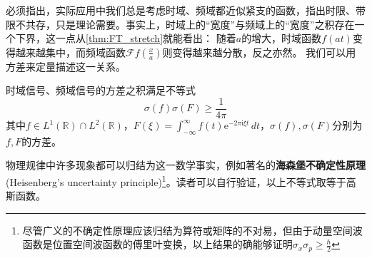 必须指出，实际应用中我们总是考虑时域、频域都近似紧支的函数，指出时限、带限不共存，只是理论需要。事实上，时域上的“宽度”与频域上的“宽度”之积存在一个下界，这一点从\cref{thm:FT_stretch}就能看出：
随着$a$的增大，时域函数$f(at)$变得越来越集中，而频域函数$\mathcal{F} f\left(\frac{x}{a}\right)$则变得越来越分散，反之亦然。
我们可以用方差来定量描述这一关系。
\begin{theorem}
    时域信号、频域信号的方差之积满足不等式
    \[\sigma(f)\sigma(F)\geq \frac{1}{4\pi}\]
    其中$f\in L^1(\mathbb{R} )\cap L^2(\mathbb{R})$，$F(\xi)=\int_{-\infty}^{\infty}f(t)\mathrm{e}^{-2\pi \mathrm{i}\xi t}\,dt$，$\sigma(f),\sigma(F)$分别为$f,F$的方差。
\end{theorem}
物理规律中许多现象都可以归结为这一数学事实，例如著名的\textbf{海森堡不确定性原理} (Heisenberg's uncertainty principle)\footnote{尽管广义的不确定性原理应该归结为算符或矩阵的不对易，但由于动量空间波函数是位置空间波函数的傅里叶变换，以上结果的确能够证明$\sigma_x \sigma_p\geq\frac{\hbar}{2}$}。读者可以自行验证，以上不等式取等于高斯函数。
